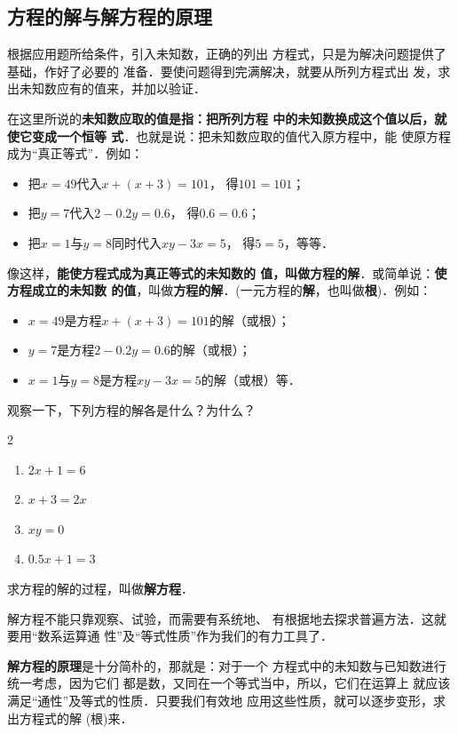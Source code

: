 \subsection{方程的解与解方程的原理}
    根据应用题所给条件，引入未知数，正确的列出
方程式，只是为解决问题提供了基础，作好了必要的
准备．要使问题得到完满解决，就要从所列方程式出
发，求出未知数应有的值来，并加以验证．

    在这里所说的\textbf{未知数应取的值是指：把所列方程
中的未知数换成这个值以后，就使它变成一个恒等
式}．也就是说：把未知数应取的值代入原方程中，能
使原方程成为“真正等式”．例如：
\begin{itemize}
    \item 把$x = 49$代入$x+ (x+3)=101$，    得$101=101$；
    \item 把$y=7$代入$2-0.2y=0.6$，    得$0 .6=0. 6$；
    \item 把$x=1$与$y=8$同时代入$xy-3x=5$，    得$5=5$，等等．
\end{itemize}
  
像这样，\textbf{能使方程式成为真正等式的未知数的
值，叫做方程的解}．或简单说：\textbf{使方程成立的未知数
的值}，叫做\textbf{方程的解}．(一元方程的\textbf{解}，也叫做\textbf{根})．例如：
\begin{itemize}
    \item $x = 49$是方程$x+ (x+3)=101$的解（或根）；
    \item $y=7$是方程$2-0.2y=0.6$的解（或根）；
    \item $x=1$与$y=8$是方程$xy-3x=5$的解（或根）等．
\end{itemize}


\begin{ex}
    观察一下，下列方程的解各是什么？为什么？
    \begin{multicols}{2}
        \begin{enumerate}
 \item $2x+1=6$
 \item $x+3=2x$
 \item $xy=0$
 \item $0.5x+1=3$           
        \end{enumerate}
    \end{multicols}
\end{ex}

求方程的解的过程，叫做\textbf{解方程}．

解方程不能只靠观察、试验，而需要有系统地、
有根据地去探求普遍方法．这就要用“数系运算通
性”及“等式性质”作为我们的有力工具了．

\textbf{解方程的原理}是十分简朴的，那就是：对于一个
方程式中的未知数与已知数进行统一考虑，因为它们
都是数，又同在一个等式当中，所以，它们在运算上
就应该满足“通性”及等式的性质．只要我们有效地
应用这些性质，就可以逐步变形，求出方程式的解
(根)来．

